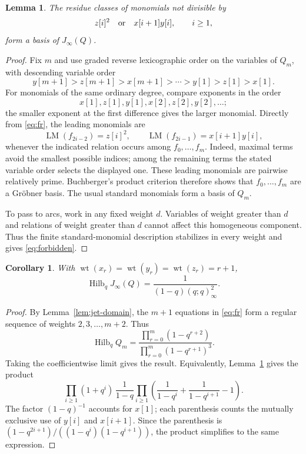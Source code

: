 \documentclass[11pt]{amsart}
\newtheorem{lemma}[theorem]{Lemma}
\newtheorem{corollary}[theorem]{Corollary}
\theoremstyle{definition}
\theoremstyle{remark}
\newcommand{\J}{J_\infty}
\DeclareMathOperator{\wt}{wt}
\newcommand{\HS}{\operatorname{Hilb}}
\begin{document}
\begin{lemma}\label{lem:groebner}
The residue classes of monomials not divisible by
\begin{equation}\label{eq:forbidden}
 z[i]^2\quad\hbox{or}\quad x[i+1]y[i],\qquad i\geq1,
\end{equation}
form a basis of $\J(Q)$.
\end{lemma}
\begin{proof}
Fix $m$ and use graded reverse lexicographic order on the variables
of $Q_m$, with descending variable order
\[
 y[m+1]>z[m+1]>x[m+1]>\cdots>y[1]>z[1]>x[1].
\]
For monomials of the same ordinary degree, compare exponents in the order
\[
 x[1],z[1],y[1],x[2],z[2],y[2],\ldots;
\]
the smaller exponent at
the first difference gives the larger monomial. Directly from
\eqref{eq:fr}, the leading monomials are
\[
 \operatorname{LM}(f_{2i-2})=z[i]^2,\qquad
 \operatorname{LM}(f_{2i-1})=x[i+1]y[i],
\]
whenever the indicated relation occurs among $f_0,\ldots,f_m$.
Indeed, maximal terms avoid the smallest possible indices; among the
remaining terms the stated variable order selects the displayed one.
These leading monomials are pairwise relatively prime. Buchberger's
product criterion therefore shows that $f_0,\ldots,f_m$ are a
Gr\"obner basis. The usual standard monomials form a basis of $Q_m$.

To pass to arcs, work in any fixed weight $d$. Variables of weight
greater than $d$ and relations of weight greater than $d$ cannot
affect this homogeneous component. Thus the finite standard-monomial
description stabilizes in every weight and gives \eqref{eq:forbidden}.
\end{proof}

\begin{corollary}\label{cor:quad-hilbert}
With $\wt(x_r)=\wt(y_r)=\wt(z_r)=r+1$,
\[
 \HS_q\J(Q)=\frac{1}{(1-q)(q;q)_\infty^2}.
\]
\end{corollary}
\begin{proof}
By Lemma~\ref{lem:jet-domain}, the $m+1$ equations in
\eqref{eq:fr} form a regular sequence of weights $2,3,\ldots,m+2$.
Thus
\[
 \HS_q Q_m=
 \frac{\prod_{r=0}^m(1-q^{r+2})}
 {\prod_{r=0}^m(1-q^{r+1})^3}.
\]
Taking the coefficientwise limit gives the result. Equivalently,
Lemma~\ref{lem:groebner} gives the product
\[
 \prod_{i\geq1}(1+q^i)\,
 \frac1{1-q}\prod_{i\geq1}
 \left(\frac1{1-q^i}+\frac1{1-q^{i+1}}-1\right).
\]
The factor $(1-q)^{-1}$ accounts for $x[1]$; each parenthesis counts
the mutually exclusive use of $y[i]$ and $x[i+1]$. Since the
parenthesis is $(1-q^{2i+1})/((1-q^i)(1-q^{i+1}))$, the product
simplifies to the same expression.
\end{proof}
\end{document}
